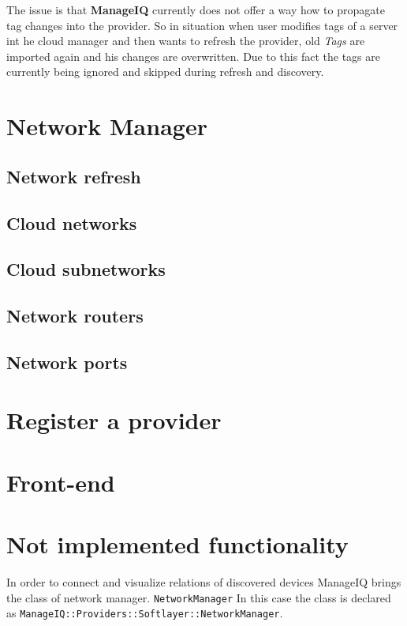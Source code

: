 The issue is that \textbf{ManageIQ} currently does not offer a way how to propagate tag changes into the provider. So in situation when user modifies tags of a server int he cloud manager and then wants to refresh the provider, old \emph{Tags} are imported again and his changes are overwritten. Due to this fact the tags are currently being ignored and skipped during refresh and discovery.

\section{Network Manager}
\label{sec:Network Manager}

\subsection{Network refresh}
\label{sub:Network refresh}

\subsection{Cloud networks}
\label{sub:Cloud networks}

\subsection{Cloud subnetworks}
\label{sub:Cloud subnetworks}

\subsection{Network routers}
\label{sub:Network routers}

\subsection{Network ports}
\label{sub:Network ports}

\section{Register a provider}
\label{sec:Register a provider}

\section{Front-end}
\label{sec:Front-end}

\section{Not implemented functionality}
\label{sec:Not implemented functionality}


In order to connect and visualize relations of discovered devices ManageIQ brings the class of network manager. \texttt{NetworkManager} In this case the class is declared as \texttt{ManageIQ::Providers::Softlayer::NetworkManager}.

